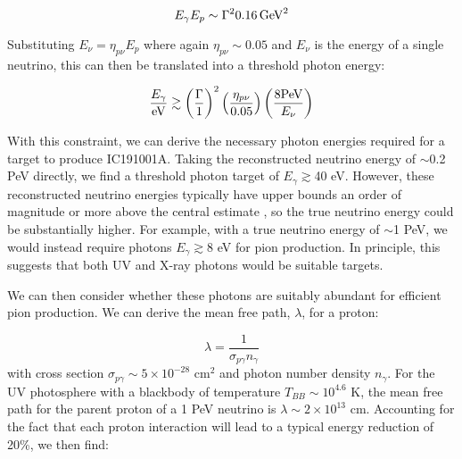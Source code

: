 \begin{equation}
E_{\gamma}E_{p} \sim \Gamma ^{2} 0.16 \,  \textup{GeV}^{2}
\end{equation}  

Substituting $E_{\nu} = \eta_{p\nu} E_{p}$ where again $\eta_{p\nu} \sim 0.05$ and $E_{\nu}$ is the energy of a single neutrino, this can then be translated into a threshold photon energy:

\begin{equation}
\frac{E_{\gamma}}{\textup{eV}} \gtrsim \left(\frac{\Gamma}{1} \right )^{2} \left(\frac{\eta_{p\nu}}{0.05} \right) \left( \frac{8 \textup{PeV}}{E_{\nu}} \right)
\end{equation}  



With this constraint, we can derive the necessary photon energies required for a target to produce IC191001A. Taking the reconstructed neutrino energy of $\sim$0.2 PeV directly, we find a threshold photon target of $E_{\gamma} \gtrsim $40 eV. However, these reconstructed neutrino energies typically have upper bounds an order of magnitude or more above the central estimate , so the true neutrino energy could be substantially higher. For example, with a true neutrino energy of $\sim$1 PeV, we would instead require photons $E_{\gamma} \gtrsim $8 eV for pion production.  In principle, this suggests that both UV and X-ray photons would be suitable targets.

We can then consider whether these photons are suitably abundant for efficient pion production. We can derive the mean free path, $\lambda$, for a proton:

\begin{equation}
\lambda = \frac{1}{\sigma_{p\gamma} n_{\gamma}}
\end{equation} with cross section $\sigma_{p\gamma} \sim 5 \times 10^{-28}$ cm$^{2}$ and photon number density $n_{\gamma}$. For the UV photosphere with a blackbody of temperature $T_{BB} \sim 10^{4.6}$ K, the mean free path for the parent proton of a 1 PeV neutrino is $\lambda \sim 2 \times 10^{13}$ cm. Accounting for the fact that each proton interaction will lead to a typical energy reduction of 20\%, we then find:

